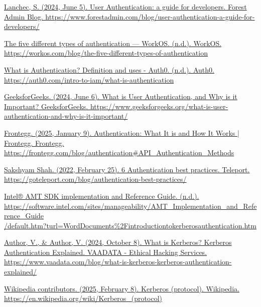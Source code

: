 \newpage
{} 
\begin{thebibliography}{9}

\href{https://www.forestadmin.com/blog/user-authentication-a-guide-for-developers/}{Lanchec, S. (2024, June 5). User Authentication: a guide for developers. Forest Admin Blog. https://www.forestadmin.com/blog/user-authentication-a-guide-for-developers/}

\href{https://workos.com/blog/the-five-different-types-of-authentication}{The five different types of authentication — WorkOS. (n.d.). WorkOS. https://workos.com/blog/the-five-different-types-of-authentication}

\href{https://auth0.com/intro-to-iam/what-is-authentication}{What is Authentication? Definition and uses - Auth0. (n.d.). Auth0. https://auth0.com/intro-to-iam/what-is-authentication}

\href{https://www.geeksforgeeks.org/what-is-user-authentication-and-why-is-it-important/}{GeeksforGeeks. (2024, June 6). What is User Authentication, and Why is it Important? GeeksforGeeks. https://www.geeksforgeeks.org/what-is-user-authentication-and-why-is-it-important/}

\href{https://frontegg.com/blog/authentication\#API_Authentication_Methods}{Frontegg. (2025, January 9). Authentication: What It is and How It Works | Frontegg. Frontegg. \url{https://frontegg.com/blog/authentication\#API_Authentication_Methods}}

\href{https://goteleport.com/blog/authentication-best-practices/}{Sakshyam Shah. (2022, February 25). 6 Authentication best practices. Teleport. https://goteleport.com/blog/authentication-best-practices/}

\href{https://software.intel.com/sites/manageability/AMT_Implementation_and_Reference_Guide/default.htm?turl=WordDocuments%2Fintroductiontokerberosauthentication.htm}{Intel® AMT SDK implementation and Reference Guide. (n.d.). https://software.intel.com/sites/manageability/AMT\_Implementation\_and\_Reference\_Guide\\/default.htm?turl=WordDocuments\%2Fintroductiontokerberosauthentication.htm}

\href{https://www.vaadata.com/blog/what-is-kerberos-kerberos-authentication-explained/}{Author, V., \& Author, V. (2024, October 8). What is Kerberos? Kerberos Authentication Explained. VAADATA - Ethical Hacking Services. \url{https://www.vaadata.com/blog/what-is-kerberos-kerberos-authentication-explained/}}

\href{https://en.wikipedia.org/wiki/Kerberos_(protocol)}{Wikipedia contributors. (2025, February 8). Kerberos (protocol). Wikipedia. https://en.wikipedia.org/wiki/Kerberos\_(protocol)}
\end{thebibliography}